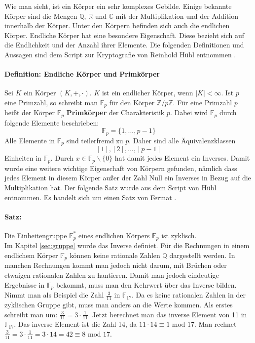 Wie man sieht, ist ein Körper ein sehr komplexes Gebilde. Einige bekannte Körper sind die Mengen $\mathbb{Q}$, $\mathbb{R}$ und $\mathbb{C}$ mit der Multiplikation und der Addition innerhalb der Körper. Unter den Körpern befinden sich auch die endlichen Körper. Endliche Körper hat eine besondere Eigenschaft. Diese bezieht sich auf die Endlichkeit und der Anzahl ihrer Elemente. Die folgenden Definitionen und Aussagen sind dem Script zur Kryptografie von Reinhold Hübl entnommen  \cite[S. 266]{Dr.ReinholdHubl.2022}.\\

\paragraph{Definition: Endliche Körper und Primkörper}
Sei $K$ ein Körper $(K,+,\cdot)$. $K$ ist ein endlicher Körper, wenn $\lvert K \rvert < \infty$. Ist $p$ eine Primzahl, so schreibt man $\mathbb{F}_p$ für den Körper $\mathbb{Z}/p\mathbb{Z}$. Für eine Primzahl $p$ heißt der Körper $\mathbb{F}_p$ \textbf{Primkörper} der Charakteristik $p$. Dabei wird $\mathbb{F}_p$ durch folgende Elemente beschrieben: $$\mathbb{F}_p =  \{1, ..., p - 1\}$$ Alle Elemente in $\mathbb{F}_p$ sind teilerfremd zu $p$. Daher sind alle Äquivalenzklassen $$[1], [2], ..., [p - 1]$$ Einheiten in $\mathbb{F}_p$. Durch $x \in \mathbb{F}_p \backslash \{0\}$ hat damit jedes Element ein Inverses. Damit wurde eine weitere wichtige Eigenschaft von Körpern gefunden, nämlich dass jedes Element in diesem Körper außer der Zahl Null ein Inverses in Bezug auf die Multiplikation hat. Der folgende Satz wurde aus dem Script von Hübl entnommen. Es handelt sich um einen Satz von Fermat \cite[S. 269]{Dr.ReinholdHubl.2022}.

\paragraph{Satz:}
Die Einheitengruppe $\mathbb{F}_p^*$ eines endlichen Körpers $\mathbb{F}_p$ ist zyklisch.\\

Im Kapitel \ref{sec:gruppe} wurde das Inverse definiet. Für die Rechnungen in einem endlichem Körper $\mathbb{F}_p$ können keine rationale Zahlen $\mathbb{Q}$ dargestellt werden. In manchen Rechnungen kommt man jedoch nicht darum, mit Brüchen oder etwaigen rationalen Zahlen zu hantieren. Damit man jedoch eindeutige Ergebnisse in $\mathbb{F}_p$ bekommt, muss man den Kehrwert über das Inverse bilden. Nimmt man als Beispiel die Zahl $\frac{3}{11}$ in $\mathbb{F}_{17}$. Da es keine rationalen Zahlen in der zyklischen Gruppe gibt, muss man anders an die Werte kommen. Als erstes schreibt man um: $\frac{3}{11} = 3 \cdot \frac{1}{11}$. Jetzt berechnet man das inverse Element von 11 in $\mathbb{F}_{17}$. Das inverse Element ist die Zahl 14, da $11 \cdot 14 \equiv 1 \text{ mod } 17$. Man rechnet $\frac{3}{11} = 3 \cdot \frac{1}{11} = 3 \cdot 14 = 42 \equiv 8 \text{ mod } 17$.\\ 

